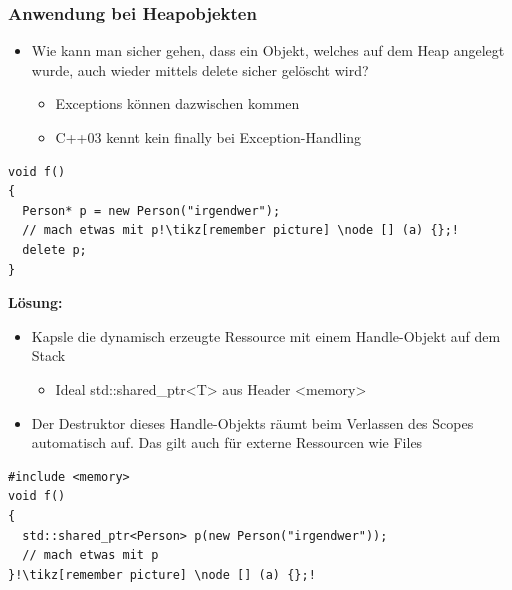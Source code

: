 \subsubsection{Anwendung bei Heapobjekten}
\begin{itemize}
  \item Wie kann man sicher gehen, dass ein Objekt, welches auf dem Heap angelegt wurde, auch wieder mittels delete sicher gelöscht wird?
  \begin{itemize}
    \item Exceptions können dazwischen kommen
    \item C++03 kennt kein finally bei Exception-Handling
  \end{itemize}
\end{itemize}
\begin{lstlisting}[style=C,escapechar=!]
void f()
{
  Person* p = new Person("irgendwer");
  // mach etwas mit p!\tikz[remember picture] \node [] (a) {};!
  delete p;
}
\end{lstlisting}
\textbf{Lösung:}
\begin{itemize}
  \item Kapsle die dynamisch erzeugte Ressource mit einem Handle-Objekt auf dem Stack
  \begin{itemize}
    \item Ideal std::shared\_ptr<T> aus Header <memory>
  \end{itemize}
  \item Der Destruktor dieses Handle-Objekts räumt beim Verlassen des Scopes automatisch auf. Das gilt auch für externe Ressourcen wie Files
\end{itemize}
\begin{lstlisting}[style=C,escapechar=!]
#include <memory>
void f()
{
  std::shared_ptr<Person> p(new Person("irgendwer"));
  // mach etwas mit p
}!\tikz[remember picture] \node [] (a) {};!
\end{lstlisting}

